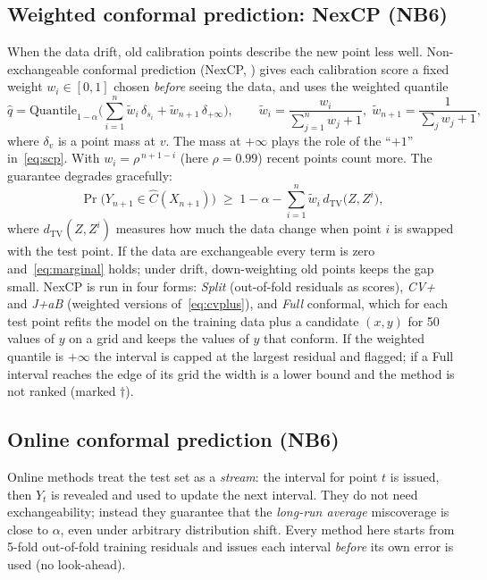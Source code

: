 \documentclass[11pt]{article}
\begin{document}
\subsection{Weighted conformal prediction: NexCP (NB6)}
When the data drift, old calibration points describe the new point less well. Non-exchangeable conformal prediction
(NexCP, \cite{barber2023beyond}) gives each calibration score a fixed weight $w_i\in[0,1]$ chosen \emph{before} seeing
the data, and uses the weighted quantile
\begin{equation}
\hat q=\mathrm{Quantile}_{1-\alpha}\Big(\sum_{i=1}^n\tilde w_i\,\delta_{s_i}+\tilde w_{n+1}\,\delta_{+\infty}\Big),\qquad
\tilde w_i=\frac{w_i}{\sum_{j=1}^nw_j+1},\;\tilde w_{n+1}=\frac{1}{\sum_jw_j+1},
\end{equation}
where $\delta_v$ is a point mass at $v$. The mass at $+\infty$ plays the role of the ``$+1$'' in~\eqref{eq:scp}. With
$w_i=\rho^{\,n+1-i}$ (here $\rho=0.99$) recent points count more. The guarantee degrades gracefully:
\begin{equation}
\Pr\big(Y_{n+1}\in\hat C(X_{n+1})\big)\;\ge\;1-\alpha-\sum_{i=1}^n\tilde w_i\,d_{\mathrm{TV}}\big(Z,Z^{i}\big),
\end{equation}
where $d_{\mathrm{TV}}(Z,Z^i)$ measures how much the data change when point $i$ is swapped with the test point. If the data are
exchangeable every term is zero and~\eqref{eq:marginal} holds; under drift, down-weighting old points keeps the gap small.
NexCP is run in four forms: \emph{Split} (out-of-fold residuals as scores), \emph{CV+} and \emph{J+aB} (weighted
versions of~\eqref{eq:cvplus}), and \emph{Full} conformal, which for each test point refits the model on the training data
plus a candidate $(x,y)$ for 50 values of $y$ on a grid and keeps the values of $y$ that conform. If the weighted quantile is
$+\infty$ the interval is capped at the largest residual and flagged; if a Full interval reaches the edge of its grid the width
is a lower bound and the method is not ranked (marked $\dagger$).

\subsection{Online conformal prediction (NB6)}
Online methods treat the test set as a \emph{stream}: the interval for point $t$ is issued, then $Y_t$ is revealed and used to
update the next interval. They do not need exchangeability; instead they guarantee that the \emph{long-run average}
miscoverage is close to $\alpha$, even under arbitrary distribution shift. Every method here starts from 5-fold out-of-fold
training residuals and issues each interval \emph{before} its own error is used (no look-ahead).
\end{document}
